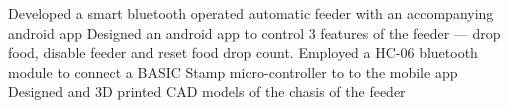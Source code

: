 \resumeItemListStart{}
\resumeItemDesc{}
{Developed a smart bluetooth operated automatic feeder with an accompanying android app}
\resumeItemDesc{}
{Designed an android app to control 3 features of the feeder --- drop food, disable feeder and reset food drop count. }
\resumeItemDesc{}
{Employed a HC-06 bluetooth module to connect a BASIC Stamp micro-controller to to the mobile app}
\resumeItemDesc{}
{Designed and 3D printed CAD models of the chasis of the feeder}
\resumeItemListEnd{}

\resumeSubHeadingListEnd{}{}
